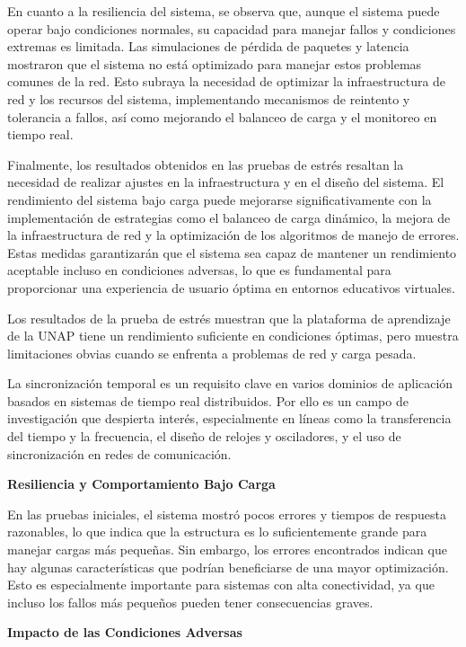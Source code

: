 \documentclass{article}
\begin{document}
En cuanto a la resiliencia del sistema, se observa que, aunque el sistema puede operar bajo condiciones normales, su capacidad para manejar fallos y condiciones extremas es limitada. Las simulaciones de pérdida de paquetes y latencia mostraron que el sistema no está optimizado para manejar estos problemas comunes de la red. Esto subraya la necesidad de optimizar la infraestructura de red y los recursos del sistema, implementando mecanismos de reintento y tolerancia a fallos, así como mejorando el balanceo de carga y el monitoreo en tiempo real.

Finalmente, los resultados obtenidos en las pruebas de estrés resaltan la necesidad de realizar ajustes en la infraestructura y en el diseño del sistema. El rendimiento del sistema bajo carga puede mejorarse significativamente con la implementación de estrategias como el balanceo de carga dinámico, la mejora de la infraestructura de red y la optimización de los algoritmos de manejo de errores. Estas medidas garantizarán que el sistema sea capaz de mantener un rendimiento aceptable incluso en condiciones adversas, lo que es fundamental para proporcionar una experiencia de usuario óptima en entornos educativos virtuales.

Los resultados de la prueba de estrés muestran que la plataforma de aprendizaje de la UNAP tiene un rendimiento suficiente en condiciones óptimas, pero muestra limitaciones obvias cuando se enfrenta a problemas de red y carga pesada.

La sincronización temporal es un requisito clave en varios dominios de aplicación basados en sistemas de tiempo real distribuidos. Por ello es un campo de investigación que despierta interés, especialmente en líneas como la transferencia del tiempo y la frecuencia, el diseño de relojes y osciladores, y el uso de sincronización en redes de comunicación.\parencite{Azketa2021113}

\textbf{Resiliencia y Comportamiento Bajo Carga}

En las pruebas iniciales, el sistema mostró pocos errores y tiempos de respuesta razonables, lo que indica que la estructura es lo suficientemente grande para manejar cargas más pequeñas. Sin embargo, los errores encontrados indican que hay algunas características que podrían beneficiarse de una mayor optimización. Esto es especialmente importante para sistemas con alta conectividad, ya que incluso los fallos más pequeños pueden tener consecuencias graves.

\textbf{Impacto de las Condiciones Adversas}
\end{document}
